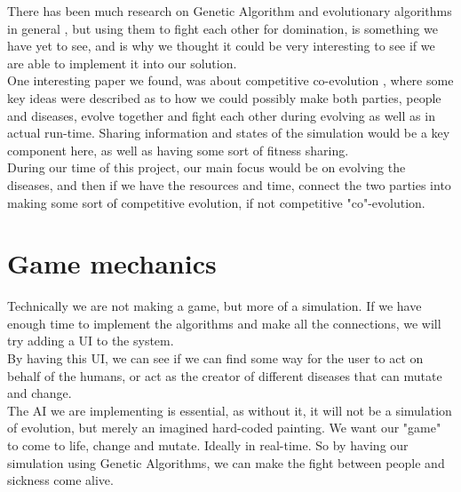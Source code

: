 \documentclass[conference,compsoc]{IEEEtran}
\begin{document}
There has been much research on Genetic Algorithm and evolutionary algorithms in general \cite{goldberg1988genetic}, but using them to fight each other for domination, is something we have yet to see, and is why we thought it could be very interesting to see if we are able to implement it into our solution.\\
One interesting paper we found, was about competitive co-evolution \cite{rosin1997new}, where some key ideas were described as to how we could possibly make both parties, people and diseases, evolve together and fight each other during evolving as well as in actual run-time. Sharing information and states of the simulation would be a key component here, as well as having some sort of fitness sharing.\\

During our time of this project, our main focus would be on evolving the diseases, and then if we have the resources and time, connect the two parties into making some sort of competitive evolution, if not competitive "co"-evolution.\\

\section{Game mechanics}
Technically we are not making a game, but more of a simulation. If we have enough time to implement the algorithms and make all the connections, we will try adding a UI to the system.\\
By having this UI, we can see if we can find some way for the user to act on behalf of the humans, or act as the creator of different diseases that can mutate and change.\\

The AI we are implementing is essential, as without it, it will not be a simulation of evolution, but merely an imagined hard-coded painting. We want our "game" to come to life, change and mutate. Ideally in real-time. So by having our simulation using Genetic Algorithms, we can make the fight between people and sickness come alive.\\
\end{document}
